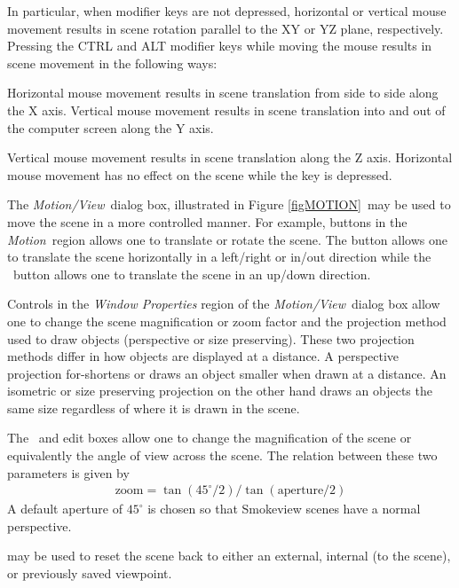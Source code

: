 \documentclass[11pt,twoside]{book}
\newcommand{\parma}{.75}
\newcommand{\parmb}{.5}
\newcommand{\parmc}{0.25}
\newcommand{\frameit}[1]{\fbox{\tt #1}}
\newcommand{\blist}{
\begin{list}
{}{
\setlength{\leftmargin}{\parma in}
\setlength{\labelwidth}{\parmb in}
\setlength{\labelsep}{\parmc in}
\setlength{\listparindent}{0.3in}
\setlength{\topsep}{.3in}
\setlength{\parsep}{.0in}
}}
\newcommand{\elist}{\end{list}}
\newcommand{\hitem}[1]{\item[{\bf #1} \hfill]}
\begin{document}
In particular, when modifier keys are not depressed, horizontal or
vertical mouse movement results in scene rotation parallel to the
XY or YZ plane, respectively. Pressing the CTRL and ALT modifier
keys while moving the mouse results in scene movement in the
following ways:

\blist

\hitem{CTRL key depressed} Horizontal mouse movement results in
scene translation from side to side along the X axis. Vertical
mouse movement results in scene translation into and out of the
computer screen along the Y axis.

\hitem{ALT key depressed} Vertical mouse movement results in scene
translation along the Z axis.  Horizontal mouse movement has no
effect on the scene while the \frameit{ALT} key is depressed.

\elist

The {\em Motion/View}\ dialog box, illustrated in Figure \ref{figMOTION}\, may be used to move the scene in a
more controlled manner. For example, buttons in the {\em Motion}\ region allows one to translate or rotate the scene.
The \frameit{Horizontal} button allows one to translate the scene horizontally in a left/right or in/out
direction while the \frameit{Vertical}\ button allows one to translate the scene in an up/down direction.

Controls in the {\em Window Properties} region of the {\em Motion/View}\ dialog box
allow one to change the scene magnification or zoom factor and the
projection method used to draw objects (perspective or size preserving).
These two projection methods differ in how objects are displayed
at a distance.  A perspective projection for-shortens or draws an
object smaller when drawn at a distance. An isometric or size preserving projection
on the other hand draws an objects the same size regardless of
where it is drawn in the scene.

The \frameit{zoom}\ and \frameit{aperture} edit boxes allow one to
change the magnification of the scene or equivalently the angle of
view across the scene.  The relation between these two parameters
is given by
\begin{eqnarray*}
\mbox{zoom}=\tan(45^\circ/2)/\tan(\mbox{aperture}/2)
\end{eqnarray*}
A default aperture of $45^\circ$ is chosen so that Smokeview
scenes have a normal perspective.


 may be used to reset the scene back to either an
external, internal (to the scene), or previously saved viewpoint.
\end{document}
